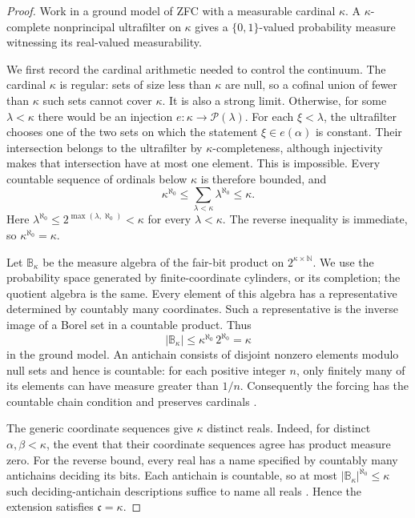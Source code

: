\begin{proof}
Work in a ground model of ZFC with a measurable cardinal $\kappa$.
A $\kappa$-complete nonprincipal ultrafilter on $\kappa$ gives a
$\{0,1\}$-valued probability measure witnessing its real-valued
measurability.

We first record the cardinal arithmetic needed to control the continuum.
The cardinal $\kappa$ is regular: sets of size less than $\kappa$ are
null, so a cofinal union of fewer than $\kappa$ such sets cannot cover
$\kappa$.  It is also a strong limit.  Otherwise, for some
$\lambda<\kappa$ there would be an injection
$e:\kappa\to\mathcal P(\lambda)$.  For each $\xi<\lambda$, the ultrafilter
chooses one of the two sets on which the statement $\xi\in e(\alpha)$ is
constant.  Their intersection belongs to the ultrafilter by
$\kappa$-completeness, although injectivity makes that intersection have
at most one element.  This is impossible.  Every countable sequence of
ordinals below $\kappa$ is therefore bounded, and
\[
  \kappa^{\aleph_0}
   \leq \sum_{\lambda<\kappa}\lambda^{\aleph_0}
   \leq \kappa.
\]
Here $\lambda^{\aleph_0}\leq
2^{\max(\lambda,\aleph_0)}<\kappa$ for every $\lambda<\kappa$.
The reverse inequality is immediate, so
$\kappa^{\aleph_0}=\kappa$.

Let $\mathbb B_\kappa$ be the measure algebra of the fair-bit product on
$2^{\kappa\times\mathbb N}$.  We use the probability space generated by
finite-coordinate cylinders, or its completion; the quotient algebra is
the same.  Every element of this algebra has a representative determined
by countably many coordinates.  Such a representative is the inverse
image of a Borel set in a countable product.  Thus
\[
 |\mathbb B_\kappa|
 \leq \kappa^{\aleph_0}\,2^{\aleph_0}=\kappa
\]
in the ground model.  An antichain consists of disjoint nonzero elements
modulo null sets and hence is countable: for each positive integer $n$,
only finitely many of its elements can have measure greater than $1/n$.
Consequently the forcing has the countable chain condition and preserves
cardinals
\cite[Chapter~VII, Theorem~5.10]{Kunen1980}.

The generic coordinate sequences give $\kappa$ distinct reals.  Indeed,
for distinct $\alpha,\beta<\kappa$, the event that their coordinate
sequences agree has product measure zero. For the reverse bound, every real
has a name specified by countably many antichains deciding its bits.  Each antichain is countable, so at most
$|\mathbb B_\kappa|^{\aleph_0}\leq\kappa$ such deciding-antichain descriptions
suffice to name all reals
\cite[Chapter~VII, Definition~5.11 and Lemmas~5.12--5.13]{Kunen1980}.
Hence the extension satisfies $\mathfrak c=\kappa$.


\end{proof}
